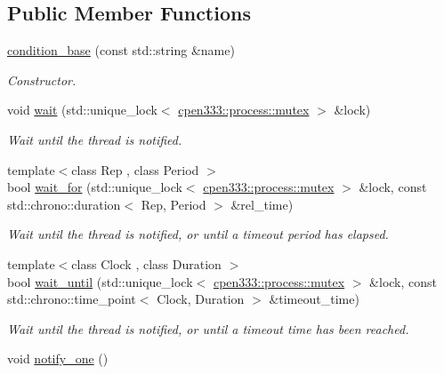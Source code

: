 \subsection*{Public Member Functions}
\begin{DoxyCompactItemize}
\item 
\hyperlink{classcpen333_1_1process_1_1condition__base_a23384ba303cc2111cc4272830ae9f72b}{condition\+\_\+base} (const std\+::string \&name)
\begin{DoxyCompactList}\small\item\em Constructor. \end{DoxyCompactList}\item 
void \hyperlink{classcpen333_1_1process_1_1condition__base_a29b67e4579cef831f709ea4c3a32ffe5}{wait} (std\+::unique\+\_\+lock$<$ \hyperlink{classcpen333_1_1process_1_1mutex}{cpen333\+::process\+::mutex} $>$ \&lock)
\begin{DoxyCompactList}\small\item\em Wait until the thread is notified. \end{DoxyCompactList}\item 
{\footnotesize template$<$class Rep , class Period $>$ }\\bool \hyperlink{classcpen333_1_1process_1_1condition__base_ab19d033fcec20cd7f2a3f0b38e67a19d}{wait\+\_\+for} (std\+::unique\+\_\+lock$<$ \hyperlink{classcpen333_1_1process_1_1mutex}{cpen333\+::process\+::mutex} $>$ \&lock, const std\+::chrono\+::duration$<$ Rep, Period $>$ \&rel\+\_\+time)
\begin{DoxyCompactList}\small\item\em Wait until the thread is notified, or until a timeout period has elapsed. \end{DoxyCompactList}\item 
{\footnotesize template$<$class Clock , class Duration $>$ }\\bool \hyperlink{classcpen333_1_1process_1_1condition__base_a6af33a75565bf4177cb6616a08acaac0}{wait\+\_\+until} (std\+::unique\+\_\+lock$<$ \hyperlink{classcpen333_1_1process_1_1mutex}{cpen333\+::process\+::mutex} $>$ \&lock, const std\+::chrono\+::time\+\_\+point$<$ Clock, Duration $>$ \&timeout\+\_\+time)
\begin{DoxyCompactList}\small\item\em Wait until the thread is notified, or until a timeout time has been reached. \end{DoxyCompactList}\item 
void \hyperlink{classcpen333_1_1process_1_1condition__base_a990220c8ee064b3d494cdbf238ceb73e}{notify\+\_\+one} ()

\end{DoxyCompactItemize}
